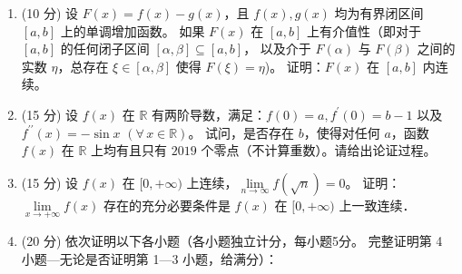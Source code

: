 \begin{enumerate}
\item[三] (10 分) 设 $F(x)=f(x)-g(x)$，且 $f(x), g(x)$ 均为有界闭区间 $[a, b]$ 上的单调增加函数。
如果 $F(x)$ 在 $[a, b]$ 上有介值性（即对于 $[a, b]$ 的任何闭子区间 $[\alpha, \beta] \subseteq[a, b]$，
以及介于 $F(\alpha)$ 与 $F(\beta)$ 之间的实数 $\eta$，总存在 $\xi \in[\alpha, \beta]$ 使得 $F(\xi)=\eta$)。
证明：$F(x)$ 在 $[a, b]$ 内连续。

\item[四] (15 分) 设 $f(x)$ 在 $\mathbb{R}$ 有两阶导数，满足：$f(0)=a, f^{\prime}(0)=b-1$ 以及 $f^{\prime \prime}(x)=-\sin x$ $(\forall\, x \in \mathbb{R})$。
试问，是否存在 $b$，使得对任何 $a$，函数 $f(x)$ 在 $\mathbb{R}$ 上均有且只有 $2019$ 个零点（不计算重数）。请给出论证过程。

\item[五] (15 分) 设 $f(x)$ 在 $[0,+\infty)$ 上连续，$\lim\limits_{n \rightarrow \infty} f(\sqrt{n})=0$。
证明： $\lim\limits_{x \rightarrow+\infty} f(x)$ 存在的充分必要条件是 $f(x)$ 在 $[0,+\infty)$ 上一致连续．

\item[六] (20 分) 依次证明以下各小题（各小题独立计分，每小题5分。
完整证明第 4 小题---无论是否证明第 1---3 小题，给满分）：
\end{enumerate}
